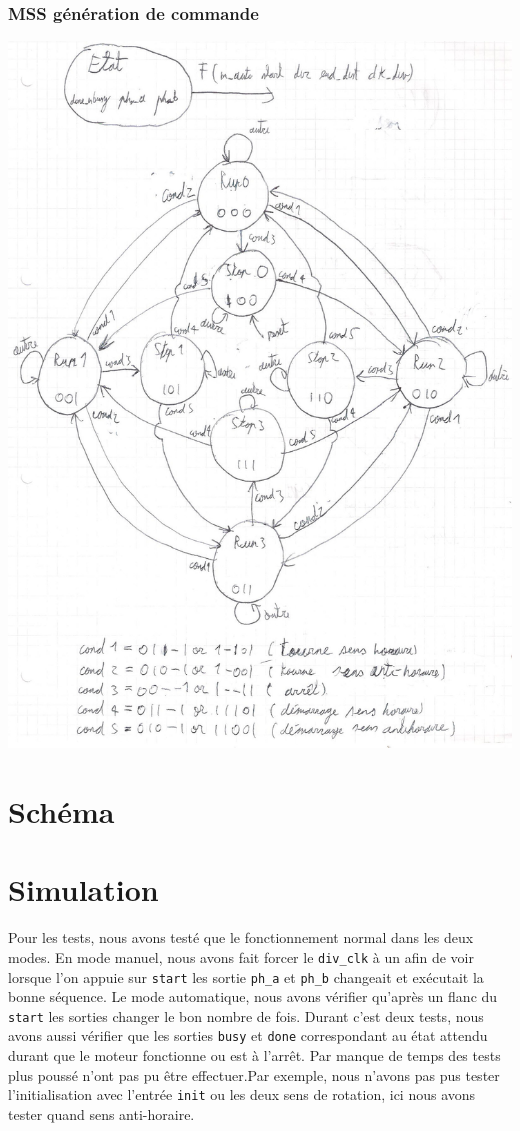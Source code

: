 \documentclass[10pt,a4paper]{article}
\begin{document}
\subsubsection{MSS génération de commande}
\includegraphics[scale=0.5]{images/MSS.jpg}

\newpage
\section{Schéma}

\newpage
\section{Simulation}
Pour les tests, nous avons testé que le fonctionnement normal dans les deux modes. En mode manuel, nous avons fait forcer le \texttt{div\_clk} à un afin de voir lorsque l'on appuie sur \texttt{start} les sortie \texttt{ph\_a} et \texttt{ph\_b} changeait et exécutait la bonne séquence. Le mode automatique, nous avons vérifier qu'après un flanc du \texttt{start} les sorties changer le bon nombre de fois. Durant c'est deux tests, nous avons aussi vérifier que les sorties \texttt{busy} et \texttt{done} correspondant au état attendu durant que le moteur fonctionne ou est à l'arrêt. Par manque de temps des tests plus poussé n'ont pas pu être effectuer.Par exemple, nous n'avons pas pus tester l'initialisation avec l'entrée \texttt{init} ou les deux sens de rotation, ici nous avons tester quand sens anti-horaire.\\
\end{document}
